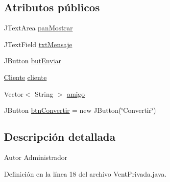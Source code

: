 \subsection*{Atributos públicos}
\begin{DoxyCompactItemize}
\item 
J\-Text\-Area \hyperlink{classcom_1_1ucab_1_1javachat_1_1_cliente_1_1view_1_1_vent_privada_a662e79a310b85a9d2992e940a170df3b}{pan\-Mostrar}
\item 
J\-Text\-Field \hyperlink{classcom_1_1ucab_1_1javachat_1_1_cliente_1_1view_1_1_vent_privada_a426509b196af3b4ace6862ccc7fc36c7}{txt\-Mensaje}
\item 
J\-Button \hyperlink{classcom_1_1ucab_1_1javachat_1_1_cliente_1_1view_1_1_vent_privada_af816b1ead45d840539150f38f6817c05}{but\-Enviar}
\item 
\hyperlink{classcom_1_1ucab_1_1javachat_1_1_cliente_1_1model_1_1_cliente}{Cliente} \hyperlink{classcom_1_1ucab_1_1javachat_1_1_cliente_1_1view_1_1_vent_privada_aa8819d3a727764f7d06a273e8a4719dd}{cliente}
\item 
Vector$<$ String $>$ \hyperlink{classcom_1_1ucab_1_1javachat_1_1_cliente_1_1view_1_1_vent_privada_a32830990861e4c6f4810828afd5eb250}{amigo}
\item 
J\-Button \hyperlink{classcom_1_1ucab_1_1javachat_1_1_cliente_1_1view_1_1_vent_privada_a23208b69a72c135e6d1cb0b18dcf7b80}{btn\-Convertir} = new J\-Button(\char`\"{}Convertir\char`\"{})
\end{DoxyCompactItemize}


\subsection{Descripción detallada}
\begin{DoxyAuthor}{Autor}
Administrador 
\end{DoxyAuthor}


Definición en la línea 18 del archivo Vent\-Privada.\-java.



